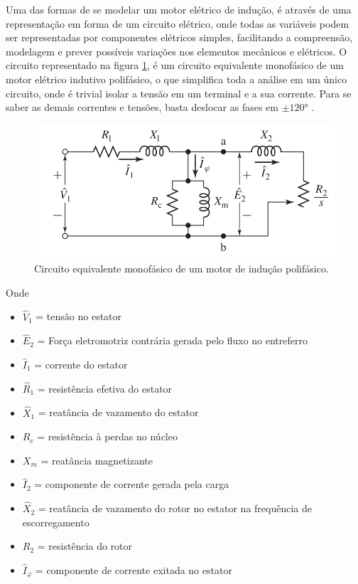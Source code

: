 Uma das formas de se modelar um motor elétrico de indução, é através de uma representação em forma de um circuito 
elétrico, onde todas as variáveis podem ser representadas por componentes elétricos simples, facilitando a compreensão, modelagem e
prever possíveis variações nos elementos mecânicos e elétricos. O circuito representado na figura \ref{fig:circuit_fitzgerald_p354},
é um circuito equivalente monofásico de um motor elétrico indutivo polifásico, o que simplifica toda a análise em um único circuito,
onde é trivial isolar a tensão em um terminal e a sua corrente. Para se saber as demais correntes e tensões, basta deslocar as fases
em $\pm\ang{120}$ \cite{Umans2003}.

\begin{figure}[H]
    \caption{Circuito equivalente monofásico de um motor de indução polifásico.}
    \begin{center}
        \includegraphics[scale=.35]{referencial/img/circuit_fitzgerald_p354.png}
    \end{center}
    \label{fig:circuit_fitzgerald_p354}
\end{figure}

Onde

\begin{itemize}
    \item $\hat{V}_1$ = tensão no estator
    \item $\hat{E}_2$ = Força eletromotriz contrária gerada pelo fluxo no entreferro
    \item $\hat{I}_1$ = corrente do estator
    \item $\hat{R}_1$ = resistência efetiva do estator
    \item $\hat{X}_1$ = reatância de vazamento do estator
    \item $R_c$ = resistência à perdas no núcleo
    \item $X_m$ = reatância magnetizante
    \item $\hat{I}_2$ = componente de corrente gerada pela carga
    \item $\hat{X}_2$ = reatância de vazamento do rotor no estator na frequência de escorregamento
    \item $R_2$ = resistência do rotor
    \item $\hat{I}_\varphi$ = componente de corrente exitada no estator
\end{itemize}


